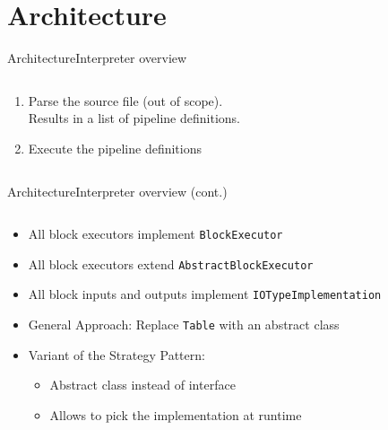 \section{Architecture}
\begin{frame}[t,fragile]{Architecture}{Interpreter overview}
	\begin{columns}[T]
		\begin{column}{0.5\linewidth}
			\begin{enumerate}
				\item Parse the source file (out of scope). \\
				      Results in a list of pipeline definitions.
				\item<2-> Execute the pipeline definitions
			\end{enumerate}
		\end{column}
		\hfill
		\begin{column}{0.5\linewidth}
			\centering
			
		\end{column}
	\end{columns}
\end{frame}
\begin{frame}[t]{Architecture}{Interpreter overview (cont.)} %
	\begin{columns}[T]
		\begin{column}{0.4\linewidth}
			\begin{itemize}
				\item<1-> All block executors implement \Verb|BlockExecutor|
				\item<2-> All block executors extend \Verb|AbstractBlockExecutor|
				\item<3-> All block inputs and outputs implement \Verb|IOTypeImplementation|
				\item<4-> General Approach: Replace \Verb|Table| with an abstract class
				\item<6-> Variant of the Strategy Pattern\footnotemark:
				      \begin{itemize}[<6->]
					      \item Abstract class instead of interface
					      \item Allows to pick the implementation at runtime
				      \end{itemize}
			\end{itemize}
		\end{column}
		\hfill
		\begin{column}{0.5\linewidth}
			\begin{center}
				\footnotesize
				 {
					
				}
				\only<5-> {
					
				}
			\end{center}
		\end{column}
	\end{columns}
\end{frame}

